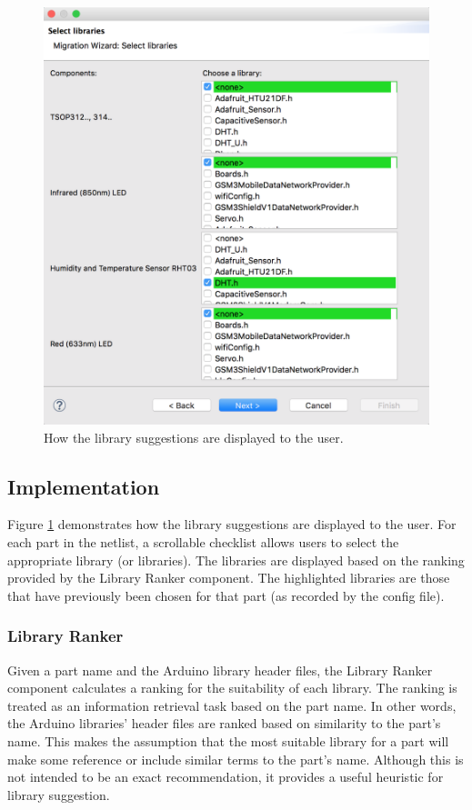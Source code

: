 \documentclass{UoYCSproject}
\begin{document}
\begin{figure}[h!]
  \centering
  \includegraphics[width=0.6\linewidth]{graphics/lib_selection_ui.png}
  \caption{How the library suggestions are displayed to the user.}
  \label{fig:lib_selection_ui}
\end{figure}

\subsection{Implementation}
Figure \ref{fig:lib_selection_ui} demonstrates how the library suggestions are displayed to the user. For each part in the netlist, a scrollable checklist allows users to select the appropriate library (or libraries). The libraries are displayed based on the ranking provided by the Library Ranker component. The highlighted libraries are those that have previously been chosen for that part (as recorded by the config file).

\subsubsection{Library Ranker} \label{lib_ranker}
Given a part name and the Arduino library header files, the Library Ranker component calculates a ranking for the suitability of each library. The ranking is treated as an information retrieval task based on the part name. In other words, the Arduino libraries' header files are ranked based on similarity to the part's name. This makes the assumption that the most suitable library for a part will make some reference or include similar terms to the part's name. Although this is not intended to be an exact recommendation, it provides a useful heuristic for library suggestion.
\end{document}
